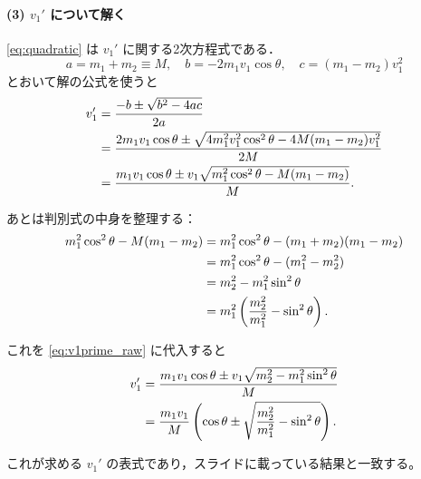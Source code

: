 \documentclass[a4paper,12pt]{jlreq}
\begin{document}
\paragraph{(3) $v_1'$ について解く}

\eqref{eq:quadratic} は $v_1'$ に関する2次方程式である．
\begin{equation}
  a = m_1 + m_2 \equiv M,\quad
  b = - 2 m_1 v_1 \cos\theta,\quad
  c = (m_1 - m_2) v_1^2
\end{equation}
とおいて解の公式を使うと
\begin{align}
  v_1'
   &= \frac{-b \pm \sqrt{b^2 - 4ac}}{2a} \notag\\
   &= \frac{2 m_1 v_1 \cos\theta
      \pm \sqrt{4 m_1^2 v_1^2 \cos^2\theta
               - 4 M (m_1 - m_2) v_1^2}}{2M} \notag\\
   &= \frac{m_1 v_1 \cos\theta
      \pm v_1 \sqrt{m_1^2 \cos^2\theta - M (m_1 - m_2)}}{M}.
  \label{eq:v1prime_raw}
\end{align}

あとは判別式の中身を整理する：
\begin{align}
  m_1^2 \cos^2\theta - M (m_1 - m_2)
   &= m_1^2 \cos^2\theta - (m_1 + m_2)(m_1 - m_2) \notag\\
   &= m_1^2 \cos^2\theta - (m_1^2 - m_2^2) \notag\\
   &= m_2^2 - m_1^2 \sin^2\theta \notag\\
   &= m_1^2 \left( \frac{m_2^2}{m_1^2} - \sin^2\theta \right).
\end{align}

これを \eqref{eq:v1prime_raw} に代入すると
\begin{align}
  v_1'
   &= \frac{m_1 v_1 \cos\theta
      \pm v_1 \sqrt{m_2^2 - m_1^2 \sin^2\theta}}{M} \notag\\
   &= \frac{m_1 v_1}{M}
      \left(
        \cos\theta
        \pm \sqrt{\frac{m_2^2}{m_1^2} - \sin^2\theta}
      \right).
\end{align}

これが求める $v_1'$ の表式であり，スライドに載っている結果と一致する。











\newpage

\end{document}
